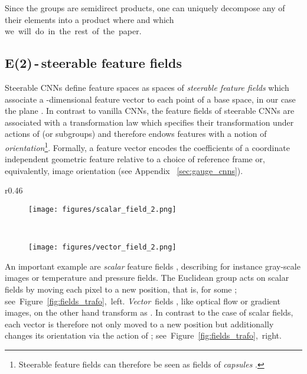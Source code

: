 \documentclass{article}
\newcommand{\apx}{Appendix\xspace
}
\newlength{\secBefore}
\newlength{\secAfter}
\newlength{\subsecBefore}
\newlength{\subsecAfter}
\begin{document}
Since the groups  are semidirect products, one can uniquely decompose any of their elements into a product  where  and  \cite{Cohen2018-IIR} which \mbox{we will do in the rest of the paper.}

 	

\vspace*{\subsecBefore}
\subsection{E(2)\,-\,steerable feature fields}
\label{sec:feature_fields}
\vspace*{\subsecAfter}


Steerable CNNs define feature spaces as spaces of \emph{steerable feature fields}
 which associate a -dimensional feature vector  to each point  of a base space, in our case the plane .
In contrast to vanilla CNNs, the feature fields of steerable CNNs are associated with a transformation law which specifies their transformation under actions of  (or subgroups) and therefore endows features with a notion of \emph{orientation}\footnote{
    Steerable feature fields can therefore be seen as fields of \emph{capsules} \cite{Sabour2017-DYNCAPS}.
}.
Formally, a feature vector  encodes the coefficients of a coordinate independent geometric feature relative to a choice of reference frame or, equivalently, image orientation (see \apx~\ref{sec:gauge_cnns}).

\begin{wrapfigure}[12]{r}{0.46\textwidth}
    \begin{subfigure}{.47\linewidth}
        \texttt{[image: figures/scalar\_field\_2.png]}\end{subfigure}
    \hspace*{1ex}~
    \begin{subfigure}{.47\linewidth}
        \texttt{[image: figures/vector\_field\_2.png]}\end{subfigure}
    \vspace*{-.6ex}
    \caption{
        Transformation behavior of -fields.
        }
    \label{fig:fields_trafo}
\end{wrapfigure}
An important example are \emph{scalar} feature fields , describing for instance gray-scale images or temperature and pressure fields.
The Euclidean group acts on scalar fields by moving each pixel to a new position, that is,  for some ; \mbox{see Figure~\ref{fig:fields_trafo}, left.}
\mbox{\emph{Vector}~fields} , like optical flow or gradient images, on the other hand transform as .
In contrast to the case of scalar fields, each vector is therefore not only moved to a new position but additionally changes its orientation via the action of ; \mbox{see Figure~\ref{fig:fields_trafo},~right.}
\end{document}
